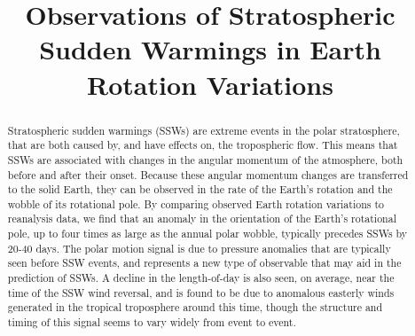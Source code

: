 \documentclass[draft,jgrga]{agutex}
\begin{document}

%
%
\newcommand{\degree}{\ensuremath{^\circ}}

%
%


\title{Observations of Stratospheric Sudden Warmings in Earth Rotation Variations}


%
%






%
%


\begin{abstract}
Stratospheric sudden warmings (SSWs) are extreme events in the polar stratosphere, that are both caused by, and have effects on, the tropospheric flow. 
This means that SSWs are associated with changes in the angular momentum of the atmosphere, both before and after their onset.
Because these angular momentum changes are transferred to the solid Earth, they can be observed in the rate of the Earth's rotation and the wobble of its rotational pole.
By comparing observed Earth rotation variations to reanalysis data, we find that an anomaly in the orientation of the Earth's rotational pole, up to four times as large as the annual polar wobble, typically precedes SSWs by 20-40 days.  
The  {polar motion signal} is due to pressure anomalies that are typically seen before SSW events, and represents a new type of observable that may aid in the prediction of SSWs.
A decline in the length-of-day is also seen,  {on average,} near the time of the SSW wind reversal,  {and is found to be due to anomalous easterly winds generated in the tropical troposphere around this time, though the structure and timing of this signal seems to vary widely from event to event.}
\end{abstract}
\end{document}
